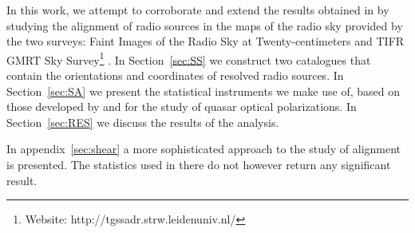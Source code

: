 	In this work, we attempt to corroborate and extend the results obtained in \cite{Taylor2016} by studying the alignment of radio sources in the maps of the radio sky provided by the two surveys: Faint Images of the Radio Sky at Twenty-centimeters \citep[FIRST;][]{Becker1995a} and TIFR GMRT Sky Survey\footnote{Website: http://tgssadr.strw.leidenuniv.nl/} \citep[TGSS;][]{Intema2016}. In Section~\ref{sec:SS} we construct two catalogues that contain the orientations and coordinates of resolved radio sources. In Section~\ref{sec:SA} we present the statistical instruments we make use of, based on those developed by \cite{Bietenholz1986} and \cite{Jain2004} for the study of quasar optical polarizations. In Section~\ref{sec:RES} we discuss the results of the analysis.
	
	In appendix~\ref{sec:shear} a more sophisticated approach to the study of alignment is presented. The statistics used in there do not however return any significant result.